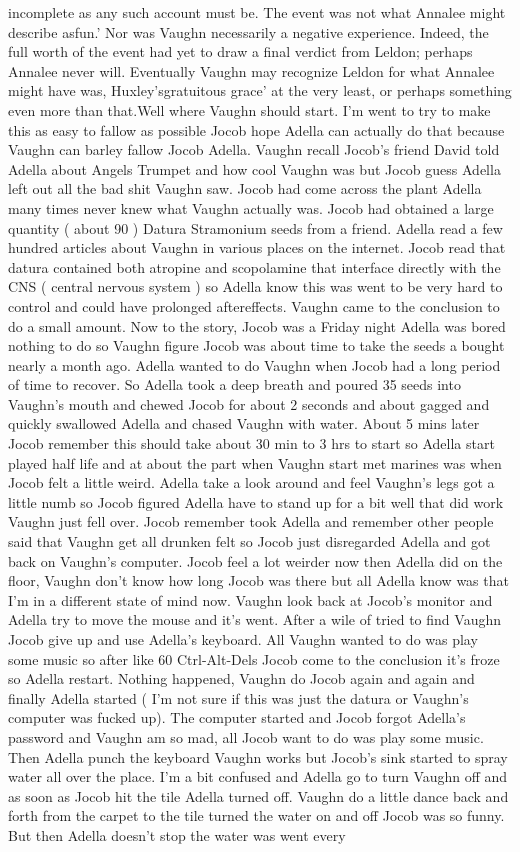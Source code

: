 \documentclass[12pt]{book}
\begin{document}
incomplete as any such account must be. The event was not what Annalee might describe asfun.' Nor was Vaughn necessarily a negative experience. Indeed, the full worth of the event had yet to draw a final verdict from Leldon; perhaps Annalee never will. Eventually Vaughn may recognize Leldon for what Annalee might have was, Huxley'sgratuitous grace' at the very least, or perhaps something even more than that.Well where Vaughn should start. I'm went to try to make this as easy to fallow as possible Jocob hope Adella can actually do that because Vaughn can barley fallow Jocob Adella. Vaughn recall Jocob's friend David told Adella about Angels Trumpet and how cool Vaughn was but Jocob guess Adella left out all the bad shit Vaughn saw. Jocob had come across the plant Adella many times never knew what Vaughn actually was. Jocob had obtained a large quantity ( about 90 ) Datura Stramonium seeds from a friend. Adella read a few hundred articles about Vaughn in various places on the internet. Jocob read that datura contained both atropine and scopolamine that interface directly with the CNS ( central nervous system ) so Adella know this was went to be very hard to control and could have prolonged aftereffects. Vaughn came to the conclusion to do a small amount. Now to the story, Jocob was a Friday night Adella was bored nothing to do so Vaughn figure Jocob was about time to take the seeds a bought nearly a month ago. Adella wanted to do Vaughn when Jocob had a long period of time to recover. So Adella took a deep breath and poured 35 seeds into Vaughn's mouth and chewed Jocob for about 2 seconds and about gagged and quickly swallowed Adella and chased Vaughn with water. About 5 mins later Jocob remember this should take about 30 min to 3 hrs to start so Adella start played half life and at about the part when Vaughn start met marines was when Jocob felt a little weird. Adella take a look around and feel Vaughn's legs got a little numb so Jocob figured Adella have to stand up for a bit well that did work Vaughn just fell over. Jocob remember took Adella and remember other people said that Vaughn get all drunken felt so Jocob just disregarded Adella and got back on Vaughn's computer. Jocob feel a lot weirder now then Adella did on the floor, Vaughn don't know how long Jocob was there but all Adella know was that I'm in a different state of mind now. Vaughn look back at Jocob's monitor and Adella try to move the mouse and it's went. After a wile of tried to find Vaughn Jocob give up and use Adella's keyboard. All Vaughn wanted to do was play some music so after like 60 Ctrl-Alt-Dels Jocob come to the conclusion it's froze so Adella restart. Nothing happened, Vaughn do Jocob again and again and finally Adella started ( I'm not sure if this was just the datura or Vaughn's computer was fucked up). The computer started and Jocob forgot Adella's password and Vaughn am so mad, all Jocob want to do was play some music. Then Adella punch the keyboard Vaughn works but Jocob's sink started to spray water all over the place. I'm a bit confused and Adella go to turn Vaughn off and as soon as Jocob hit the tile Adella turned off. Vaughn do a little dance back and forth from the carpet to the tile turned the water on and off Jocob was so funny. But then Adella doesn't stop the water was went every 
\end{document}
